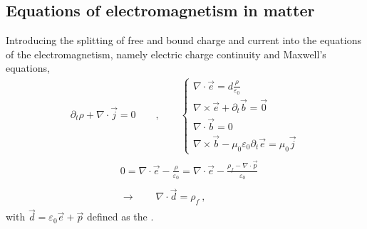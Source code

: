 \documentclass[letterpaper,10pt,english]{jupyterBook}
\begin{document}
\subsection{Equations of electromagnetism in matter}
\label{\detokenize{ch/principles-matter:equations-of-electromagnetism-in-matter}}\label{\detokenize{ch/principles-matter:classical-electromagnetism-media-vacuum-to-matter}}
\sphinxAtStartPar
Introducing the splitting of free and bound charge and current into the equations of the electromagnetism, namely electric charge continuity and Maxwell’s equations,
\begin{equation*}
\begin{split}
\partial_t \rho + \nabla \cdot \vec{j} = 0
\qquad , \qquad
\begin{cases}
\nabla \cdot \vec{e} = d\frac{\rho}{\varepsilon_0} \\
\nabla \times \vec{e} + \partial_t \vec{b} = \vec{0} \\
\nabla \cdot \vec{b} = 0 \\
\nabla \times \vec{b} - \mu_0 \varepsilon_0 \partial_t \vec{e} = \mu_0 \vec{j}
\end{cases}\end{split}
\end{equation*}
\sphinxAtStartPar
{}
\begin{equation*}
\begin{split}\begin{aligned}
    & 0  = \nabla \cdot \vec{e} - \frac{\rho}{\varepsilon_0} = \nabla \cdot \vec{e} - \frac{\rho_f - \nabla \cdot \vec{p}}{\varepsilon_0}  \\ \\
    & \rightarrow \qquad \nabla \cdot \vec{d} = \rho_f \ ,
  \end{aligned}\end{split}
\end{equation*}
\sphinxAtStartPar
with \(\vec{d} = \varepsilon_0 \vec{e} + \vec{p}\) defined as the .
\end{document}
